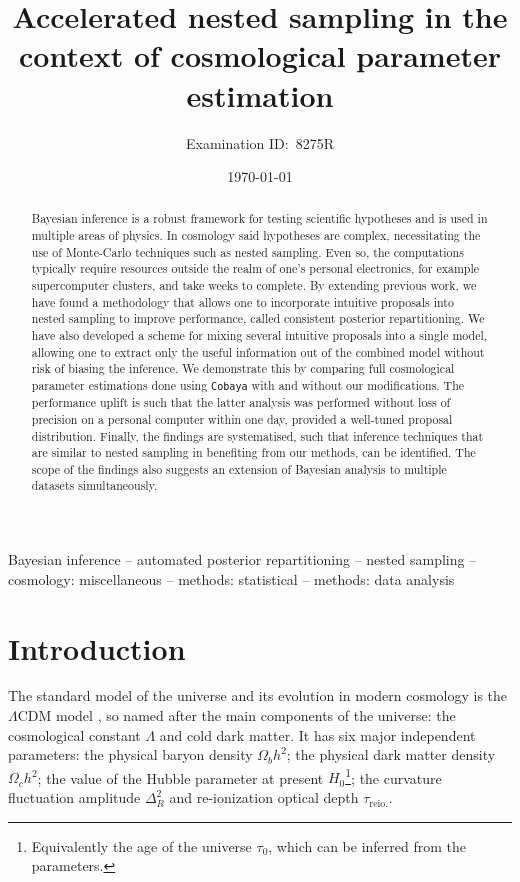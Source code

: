 \documentclass[usenatbib]{mnras}
\author[8275R]{Examination ID:~8275R}
\date{\today}
\title[Accelerated Nested Sampling]{Accelerated nested sampling in the context of cosmological parameter estimation}
\begin{document}
\maketitle
\begin{abstract}
  Bayesian inference is a robust framework for testing scientific
  hypotheses and is used in multiple areas of physics. In cosmology
  said hypotheses are complex, necessitating the use of Monte-Carlo
  techniques such as nested sampling. Even so, the computations
  typically require resources outside the realm of one's personal
  electronics, for example supercomputer clusters, and take weeks to
  complete. By extending previous work, we have found a methodology
  that allows one to incorporate intuitive proposals into nested
  sampling to improve performance, called consistent posterior
  repartitioning. We have also developed a scheme for mixing several
  intuitive proposals into a single model, allowing one to extract
  only the useful information out of the combined model without risk
  of biasing the inference. We demonstrate this by comparing full
  cosmological parameter estimations done using \texttt{Cobaya} with
  and without our modifications. The performance uplift is such that
  the latter analysis was performed without loss of precision on a
  personal computer within one day, provided a well-tuned proposal
  distribution. Finally, the findings are systematised, such that
  inference techniques that are similar to nested sampling in
  benefiting from our methods, can be identified. The scope of the
  findings also suggests an extension of Bayesian analysis to multiple
  datasets simultaneously.
\end{abstract}

\begin{keywords}
Bayesian inference -- automated posterior repartitioning -- nested sampling -- cosmology: miscellaneous -- methods: statistical -- methods: data analysis
\end{keywords}

\section{Introduction}\label{sec:org14413d7}

The standard model of the universe and its evolution in modern
cosmology is the \(\Lambda\)CDM model \citep{Condon2018}, so named
after the main components of the universe: the cosmological constant
\(\Lambda\) and cold dark matter. It has six major independent
parameters: the physical baryon density \(\Omega_{b}h^{2}\); the
physical dark matter density \(\Omega_{c}h^{2}\); the value of the
Hubble parameter at present \(H_{0}\)\footnote{Equivalently the age of
  the universe \(\tau_0\), which can be inferred from the
  parameters. }; the curvature fluctuation amplitude
\(\Delta_{R}^{2}\) and re-ionization optical depth
\(\tau_\text{reio.}\).
\end{document}
